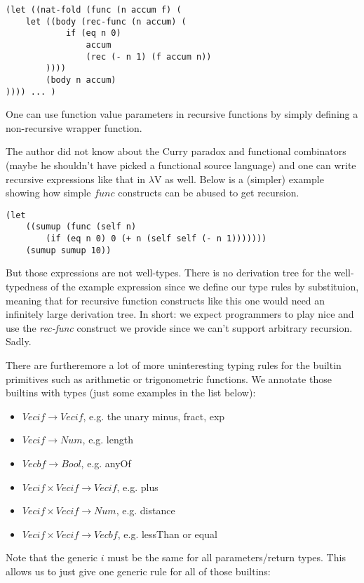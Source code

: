 \documentclass[letterpaper,12pt]{article}
\begin{document}
\begin{lstlisting}
(let ((nat-fold (func (n accum f) (
	let ((body (rec-func (n accum) (
			if (eq n 0)
				accum
				(rec (- n 1) (f accum n))
		))))
		(body n accum)
)))) ... )
\end{lstlisting}

One can use function value parameters in recursive functions
by simply defining a non-recursive wrapper function.

The author did not know about the Curry paradox and functional
combinators (maybe he shouldn't have picked a functional source language)
and one can write recursive expressions like that in $\lambda$V as well.
Below is a (simpler) example showing how simple $func$ constructs can
be abused to get recursion.

\begin{lstlisting}
(let 
	((sumup (func (self n) 
		(if (eq n 0) 0 (+ n (self self (- n 1)))))))
	(sumup sumup 10))
\end{lstlisting}

But those expressions are not well-types. There is no derivation tree
for the well-typedness of the example expression since we define our
type rules by substituion, meaning that for recursive function constructs
like this one would need an infinitely large derivation tree.
In short: we expect programmers to play nice and use the \textit{rec-func}
construct we provide since we can't support arbitrary recursion. Sadly.

There are furtheremore a lot of more uninteresting typing rules for
the builtin primitives such as arithmetic or trigonometric functions.
We annotate those builtins with types (just some examples in the list below):

\begin{itemize}
	\item $Vecif \rightarrow Vecif$, e.g. the unary minus, fract, exp
	\item $Vecif \rightarrow Num$, e.g. length
	\item $Vecbf \rightarrow Bool$, e.g. anyOf
	\item $Vecif \times Vecif \rightarrow Vecif$, e.g. plus
	\item $Vecif \times Vecif \rightarrow Num$, e.g. distance
	\item $Vecif \times Vecif \rightarrow Vecbf$, e.g. lessThan or equal
\end{itemize}

Note that the generic $i$ must be the same for all parameters/return types.
This allows us to just give one generic rule for all of those builtins:
\end{document}
